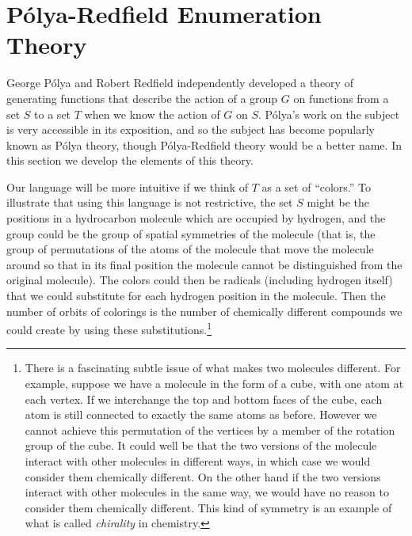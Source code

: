 \documentclass[10pt,]{book}
\theoremstyle{plain}
\theoremstyle{definition}
\numberwithin{equation}{chapter}
\begin{document}
\section[{Pólya-Redfield Enumeration Theory}]{Pólya-Redfield Enumeration Theory}\label{sec_groups-polya}
George Pólya and Robert Redfield independently developed a theory of generating functions that describe the action of a group \(G\) on functions from a set \(S\) to a set \(T\) when we know the action of \(G\) on \(S\). Pólya's work on the subject is very accessible in its exposition, and so the subject has become popularly known as Pólya theory, though Pólya-Redfield theory would be a better name. In this section we develop the elements of this theory.%
\par
Our language will be more intuitive if we think of \(T\) as a set of ``colors.'' To illustrate that using this language is not restrictive, the set \(S\) might be the positions in a hydrocarbon molecule which are occupied by hydrogen, and the group could be the group of spatial symmetries of the molecule (that is, the group of permutations of the atoms of the molecule that move the molecule around so that in its final position the molecule cannot be distinguished from the original molecule). The colors could then be radicals (including hydrogen itself) that we could substitute for each hydrogen position in the molecule. Then the number of orbits of colorings is the number of chemically different compounds we could create by using these substitutions.\footnote{There is a fascinating subtle issue of what makes two molecules different.  For example, suppose we have a molecule in the form of a cube, with one atom at each vertex.  If we interchange the top and bottom faces of the cube, each atom is still connected to exactly the same atoms as before.   However we cannot achieve this permutation of the vertices by a member of the rotation group of the cube.  It could well be that the two versions of the molecule interact with other molecules in different ways, in which case we would consider them chemically different.  On the other hand if the two versions interact with other molecules in the same way, we would have no reason to consider them chemically different.  This kind of symmetry is an example of what is called \emph{chirality} in chemistry.\label{fn-24}}%
\par
\end{document}
